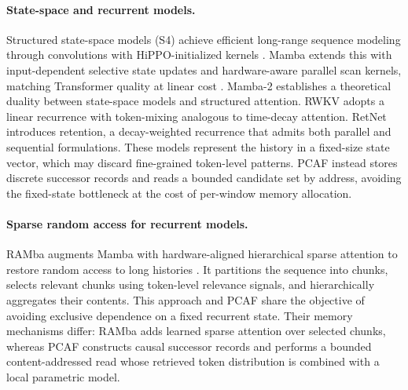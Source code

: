 \documentclass{article}
\begin{document}
\paragraph{State-space and recurrent models.}
Structured state-space models (S4) achieve efficient long-range sequence
modeling through convolutions with HiPPO-initialized kernels
\citep{gu2021s4}. Mamba extends this with input-dependent selective state
updates and hardware-aware parallel scan kernels, matching Transformer quality
at linear cost \citep{gu2023mamba}. Mamba-2 \citep{dao2024mamba2} establishes
a theoretical duality between state-space models and structured attention.
RWKV \citep{peng2023rwkv} adopts a linear recurrence with token-mixing
analogous to time-decay attention. RetNet \citep{sun2023retnet} introduces
retention, a decay-weighted recurrence that admits both parallel and sequential
formulations. These models represent the history in a fixed-size state vector,
which may discard fine-grained token-level patterns. PCAF instead stores
discrete successor records and reads a bounded candidate set by address,
avoiding the fixed-state bottleneck at the cost of per-window memory
allocation.

\paragraph{Sparse random access for recurrent models.}
RAMba augments Mamba with hardware-aligned hierarchical sparse attention to
restore random access to long histories \citep{hu2025ramba}. It partitions the
sequence into chunks, selects relevant chunks using token-level relevance
signals, and hierarchically aggregates their contents. This approach and PCAF
share the objective of avoiding exclusive dependence on a fixed recurrent
state. Their memory mechanisms differ: RAMba adds learned sparse attention over
selected chunks, whereas PCAF constructs causal successor records and performs
a bounded content-addressed read whose retrieved token distribution is combined
with a local parametric model.
\end{document}
